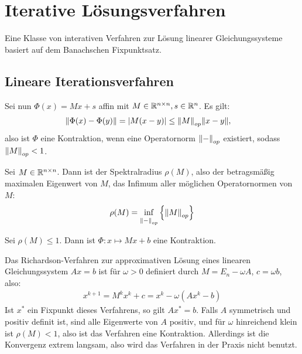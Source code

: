 \documentclass{report}
\begin{document}
	\chapter{Iterative Lösungsverfahren}
	Eine Klasse von interativen Verfahren zur Lösung linearer Gleichungssysteme basiert auf dem Banachschen Fixpunktsatz.
	\section{Lineare Iterationsverfahren}
	Sei nun $\Phi(x) = Mx + s$ affin mit $M \in \mathbb{R}^{n \times n}, s \in \mathbb{R}^n$. Es gilt:
	\begin{align*}
		\norm{\Phi(x) - \Phi(y)} &= \abs{M(x-y)} \leq \norm{M}_{op} \norm{x-y},
	\end{align*}
	also ist $\Phi$ eine Kontraktion, wenn eine Operatornorm $\norm{-}_{op}$ existiert, sodass $\norm{M}_{op} < 1$.
	\begin{theorem}
		Sei $M \in \mathbb{R}^{n \times n}$. Dann ist der Spektralradius $\rho(M)$, also der betragsmäßig maximalen Eigenwert von $M$, das Infimum aller möglichen Operatornormen von $M$:
		\begin{align*}
			\rho(M) = \inf_{\norm{-}_{op}} \lr{\norm{M}_{op}}
		\end{align*}
	\end{theorem}
	\begin{corollary}
		Sei $\rho(M) \leq 1$. Dann ist $\Phi : x \mapsto Mx + b$ eine Kontraktion.
	\end{corollary}
	\begin{example}
		Das Richardson-Verfahren zur approximativen Lösung eines linearen Gleichungssystem $Ax = b$ ist für $\omega > 0$ definiert durch $M = E_n - \omega A$, $c = \omega b$, also:
			\begin{align*}
				x^{k+1} = M^k x^{k} + c = x^k - \omega (Ax^k - b)
			\end{align*}
			Ist $x^*$ ein Fixpunkt dieses Verfahrens, so gilt $Ax^* = b$.
			\newpar
			Falls $A$ symmetrisch und positiv definit ist, sind alle Eigenwerte von $A$ positiv, und für $\omega$ hinreichend klein ist $\rho(M) < 1$, also ist das Verfahren eine Kontraktion.
			Allerdings ist die Konvergenz extrem langsam, also wird das Verfahren in der Praxis nicht benutzt.
	\end{example}
\end{document}
